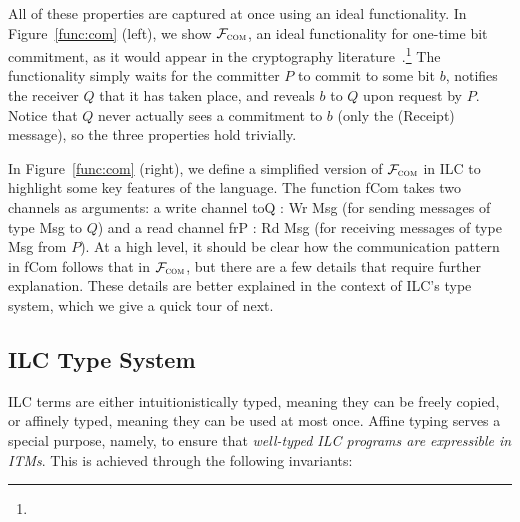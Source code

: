 %
All of these properties are captured at once using an ideal functionality. In
Figure~\ref{func:com} (left), we show $\mathcal{{F}}_{\textsc{com}}$, an ideal
functionality for one-time bit commitment, as it would appear in the
cryptography literature~\cite{canetti2001commitments}.\footnote{} The functionality simply
waits for the committer $P$ to commit to some bit $b$, notifies the receiver $Q$
that it has taken place, and reveals $b$ to $Q$ upon request by $P$. Notice that
$Q$ never actually sees a commitment to $b$ (only the (\textsf{Receipt})
message), so the three properties hold trivially.
%

In Figure~\ref{func:com} (right), we define a simplified version of
$\mathcal{{F}}_{\textsc{com}}$ in ILC to highlight some key features of the
language. The function \textsf{fCom} takes two channels as arguments: a write
channel \textsf{toQ : Wr Msg} (for sending messages of type \textsf{Msg} to $Q$)
and a read channel \textsf{frP : Rd Msg} (for receiving messages of type
\textsf{Msg} from $P$). At a high level, it should be clear how the
communication pattern in \textsf{fCom} follows that in $\mathcal{{F}}_{\textsc{com}}$,
but there are a few details that require further explanation. These details are
better explained in the context of ILC's type system, which we give a quick tour
of next.

\subsection{ILC Type System}
\label{subsec:type-tour}

ILC terms are either intuitionistically typed, meaning they can be freely
copied, or affinely typed, meaning they can be used at most once. Affine typing
serves a special purpose, namely, to ensure that \emph{well-typed ILC programs
  are expressible in ITMs}. This is achieved through the following invariants:

